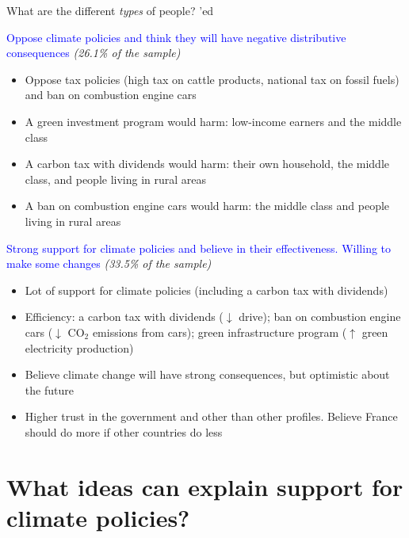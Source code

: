 \begin{framefont}{\small}
\begin{frame}{What are the different \textit{types} of people? 'ed}
\begin{itemize}
\ip \textcolor{blue}{Oppose climate policies and think they will have negative distributive consequences} \textit{(26.1\% of the sample)}
	\begin{itemize}
		\item Oppose tax policies (high tax on cattle products, national tax on fossil fuels) and ban on combustion engine cars
		\item A green investment program would harm: low-income earners and the middle class
		\item A carbon tax with dividends would harm: their own household, the middle class, and people living in rural areas
		\item A ban on combustion engine cars would harm: the middle class and people living in rural areas
	\end{itemize}
\ip \textcolor{blue}{Strong support for climate policies and believe in their effectiveness. Willing to make some changes} \textit{(33.5\% of the sample)}
	\begin{itemize}
		\item Lot of support for climate policies (including a carbon tax with dividends)
		\item Efficiency: a carbon tax with dividends ($\downarrow$ drive); ban on combustion engine cars ($\downarrow$ CO$_\text{2}$ emissions from cars); green infrastructure program ($\uparrow$ green electricity production)
		\item Believe climate change will have strong consequences, but optimistic about the future
		\item Higher trust in the government and other than other profiles. Believe France should do more if other countries do less
	\end{itemize}
\end{itemize}
\end{frame}


\section{What ideas can explain support for climate policies?}


\end{framefont}
